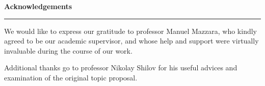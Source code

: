 \newpage
\thispagestyle{empty}


\begin{titlepage}


\begin{flushleft}
{\Large \bf
Acknowledgements
}


\vspace{0.01cm}

\rule{\linewidth}{0.05cm}%

\end{flushleft}

{
We would like to express our gratitude to  professor Manuel Mazzara, who kindly agreed to be our academic supervisor, and whose
help and support were virtually invaluable during the course of our work.

Additional thanks go to professor Nikolay Shilov for his useful advices and examination of the original topic proposal.
}

\end{titlepage}
